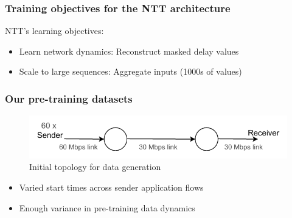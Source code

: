 \documentclass{beamer}
\begin{document}
\begin{frame}
\frametitle{Training objectives for the NTT architecture}

NTT's learning objectives: 
\pause 
\begin{itemize}
    \item<1-> \alert{Learn network dynamics:}  Reconstruct masked delay values
    \pause
    \item<1-> \alert{Scale to large sequences:}  Aggregate inputs (1000s of values)
    \end{itemize}
\end{frame}



\begin{frame}
\frametitle{Our pre-training datasets}


\begin{figure}[h]
  \begin{center}
    \includegraphics[scale=0.8]{figures/simple_topo.pdf}
    \caption{Initial topology for data generation}
    \label{fig:topo}
  \end{center}
\end{figure}
 
 \pause

\begin{itemize}
    \item<1-> Varied start times across sender application flows
    \item<1-> Enough variance in pre-training data dynamics 
    \end{itemize}

\end{frame}
\end{document}
